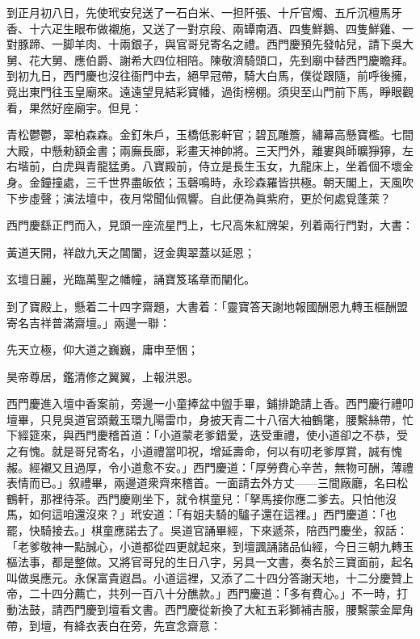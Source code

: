 到正月初八日，先使玳安兒送了一石白米、一担阡張、十斤官燭、五斤沉檀馬牙香、十六疋生眼布做襯施，又送了一對京段、兩罈南酒、四隻鮮鵝、四隻鮮雞、一對豚蹄、一脚羊肉、十兩銀子，與官哥兒寄名之禮。西門慶預先發帖兒，請下吳大舅、花大舅、應伯爵、謝希大四位相陪。陳敬濟騎頭口，先到廟中替西門慶瞻拜。到初九日，西門慶也沒往衙門中去，絕早冠帶，騎大白馬，僕從跟隨，前呼後擁，竟出東門往玉皇廟來。遠遠望見結彩寶幡，過街榜棚。須臾至山門前下馬，睜眼觀看，果然好座廟宇。但見：

\begin{myquote}
青松鬱鬱，翠柏森森。金釘朱戶，玉橋低影軒官；碧瓦雕簷，繡幕高懸寶檻。七間大殿，中懸勑額金書；兩廡長廊，彩畫天神帥將。三天門外，離婁與師曠猙獰，左右堦前，白虎與青龍猛勇。八寶殿前，侍立是長生玉女，九龍床上，坐着個不壞金身。金鐘撞處，三千世界盡皈依；玉磬鳴時，永珍森羅皆拱極。朝天閣上，天風吹下步虛聲；演法壇中，夜月常聞仙佩響。自此便為眞紫府，更於何處覓蓬萊？
\end{myquote}

西門慶繇正門而入，見頭一座流星門上，七尺高朱紅牌架，列着兩行門對，大書：

\begin{myquote}
黃道天開，祥啟九天之閶闔，迓金輿翠蓋以延恩；

玄壇日麗，光臨萬聖之幡幢，誦寶笈瑤章而闡化。
\end{myquote}

到了寶殿上，懸着二十四字齋題，大書着：「靈寶答天謝地報國酬恩九轉玉樞酬盟寄名吉祥普滿齋壇。」兩邊一聯：

\begin{myquote}
先天立極，仰大道之巍巍，庸申至悃；

昊帝尊居，鑑清修之翼翼，上報洪恩。
\end{myquote}

西門慶進入壇中香案前，旁邊一小童捧盆中盥手畢，鋪排跪請上香。西門慶行禮叩壇畢，只見吳道官頭戴玉環九陽雷巾，身披天青二十八宿大袖鶴氅，腰繫絲帶，忙下經筵來，與西門慶稽首道：「小道蒙老爹錯愛，迭受重禮，使小道卻之不恭，受之有愧。就是哥兒寄名，小道禮當叩祝，增延壽命，何以有叨老爹厚賞，誠有愧赧。經襯又且過厚，令小道愈不安。」西門慶道：「厚勞費心辛苦，無物可酬，薄禮表情而已。」叙禮畢，兩邊道衆齊來稽首。一面請去外方丈——三間廠廳，名曰松鶴軒，那裡待茶。西門慶剛坐下，就令棋童兒：「拏馬接你應二爹去。只怕他沒馬，如何這咱還沒來？」玳安道：「有姐夫騎的驢子還在這裡。」西門慶道：「也罷，快騎接去。」棋童應諾去了。吳道官誦畢經，下來遞茶，陪西門慶坐，叙話：「老爹敬神一點誠心，小道都從四更就起來，到壇諷誦諸品仙經，今日三朝九轉玉樞法事，都是整做。又將官哥兒的生日八字，另具一文書，奏名於三寶面前，起名叫做吳應元。永保富貴遐昌。小道這裡，又添了二十四分答謝天地，{}十二分慶贊上帝，二十四分薦亡，共列一百八十分醮款。」西門慶道：「多有費心。」不一時，打動法鼓，請西門慶到壇看文書。西門慶從新換了大紅五彩獅補吉服，腰繫蒙金犀角帶，到壇，有絳衣表白在旁，先宣念齋意：

